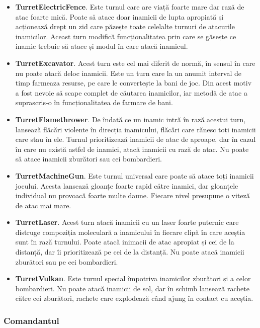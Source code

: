 \documentclass[12pt, a4paper]{article}
\begin{document}
	\begin{itemize}
		\item \textbf{TurretElectricFence}. Este turnul care are viață foarte mare dar rază de atac foarte mică. Poate să atace doar inamicii de lupta apropiată și acționează drept un zid care păzește toate celelalte turnuri de atacurile inamicilor. Aceast turn modifică funcționalitatea prin care se găsește ce inamic trebuie să atace și modul în care atacă inamicul.
		\item \textbf{TurretExcavator}. Acest turn este cel mai diferit de normă, în sensul în care nu poate atacă deloc inamicii. Este un turn care la un anumit interval de timp farmeaza resurse, pe care le convertește la bani de joc. Din acest motiv a fost nevoie să scape complet de căutarea inamicilor, iar metodă de atac a suprascris-o în funcționalitatea de farmare de bani.
		\item \textbf{TurretFlamethrower}. De îndată ce un inamic intră în rază acestui turn, lansează flăcări violente în direcția inamicului, flăcări care rănesc toți inamicii care stau în ele. Turnul prioritizează inamicii de atac de aproape, dar în cazul în care nu există astfel de inamici, atacă inamicii cu rază de atac. Nu poate să atace inamicii zburători sau cei bombardieri.
		\item \textbf{TurretMachineGun}. Este turnul universal care poate să atace toți inamicii jocului. Acesta lansează gloanțe foarte rapid către inamici, dar gloanțele individual nu provoacă foarte multe daune. Fiecare nivel presupune o viteză de atac mai mare.
		\item \textbf{TurretLaser}. Acest turn atacă inamicii cu un laser foarte puternic care distruge compoziția moleculară a inamicului în fiecare clipă în care aceștia sunt în rază turnului. Poate atacă inimacii de atac apropiat și cei de la distanță, dar îi prioritizează pe cei de la distanță. Nu poate atacă inamicii zburători sau pe cei bombardieri.
		\item \textbf{TurretVulkan}. Este turnul special împotriva inamicilor zburători și a celor bombardieri. Nu poate atacă inamicii de sol, dar în schimb lansează rachete către cei zburători, rachete care explodează când ajung în contact cu aceștia.
	\end{itemize}
	
	
	
	
	
	\subsubsection{Comandantul}
	\label{section: commander}
	
\end{document}
